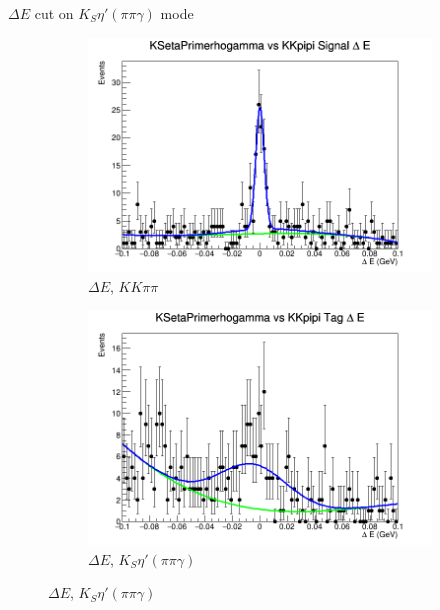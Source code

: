 \documentclass{beamer}
\begin{document}
\begin{frame}{$\Delta E$ cut on $K_S\eta'(\pi\pi\gamma)$ mode}
  \begin{figure}
    \centering
    \begin{subfigure}{0.5\textwidth}
      \centering
      \includegraphics[width=\textwidth]{KSetaPrimerhogammaSignalDeltaE.png}
      \caption{$\Delta E$, $KK\pi\pi$}
    \end{subfigure}%
    \begin{subfigure}{0.5\textwidth}
      \centering
      \includegraphics[width=\textwidth]{KSetaPrimerhogammaTagDeltaE.png}
      \caption{$\Delta E$, $K_S\eta'(\pi\pi\gamma)$}
    \end{subfigure}
  \end{figure}
\end{frame}
\end{document}
